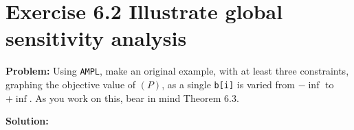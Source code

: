 \section{Exercise 6.2 Illustrate global sensitivity analysis}
\textbf{Problem:} Using {\tt AMPL}, make an original example, with at least three constraints, graphing the objective value of $(P)$, as a single {\tt b[i]} is varied from $-\inf$ to $+\inf$. As you work on this, bear in mind Theorem 6.3.

\textbf{Solution:} 